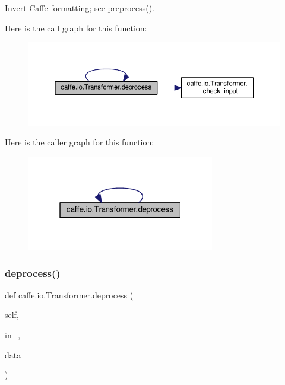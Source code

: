 \begin{DoxyVerb}Invert Caffe formatting; see preprocess().
\end{DoxyVerb}
 Here is the call graph for this function\+:
\nopagebreak
\begin{figure}[H]
\begin{center}
\leavevmode
\includegraphics[width=350pt]{classcaffe_1_1io_1_1_transformer_a3d048b7f8d255d29c04c2bcce0db318e_cgraph}
\end{center}
\end{figure}
Here is the caller graph for this function\+:
\nopagebreak
\begin{figure}[H]
\begin{center}
\leavevmode
\includegraphics[width=232pt]{classcaffe_1_1io_1_1_transformer_a3d048b7f8d255d29c04c2bcce0db318e_icgraph}
\end{center}
\end{figure}
\mbox{\label{classcaffe_1_1io_1_1_transformer_a3d048b7f8d255d29c04c2bcce0db318e}} 
\subsubsection{\texorpdfstring{deprocess()}{deprocess()}\hspace{0.1cm}{\footnotesize\ttfamily [2/2]}}
{\footnotesize\ttfamily def caffe.\+io.\+Transformer.\+deprocess (\begin{DoxyParamCaption}\item[{}]{self,  }\item[{}]{in\+\_\+,  }\item[{}]{data }\end{DoxyParamCaption})}

